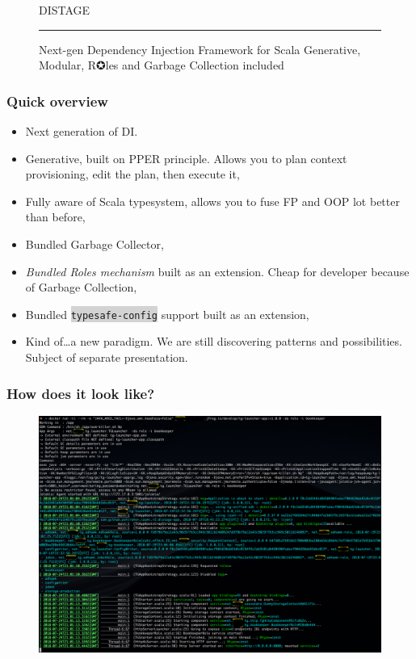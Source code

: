 \documentclass[usenames,dvipsnames]{beamer}
\newcommand{\code}[1]{\colorbox{lightgray}{\texttt{#1}}}
\begin{document}
\begin{frame}
\begin{figure}
\Huge 
\color{RubineRed} DISTAGE
\noindent
{\color{RubineRed} \rule{\linewidth}{1mm} }
\Large Next-gen Dependency Injection Framework for Scala
\normalsize Generative, Modular, R✪les and Garbage Collection included 
\end{figure}
\end{frame}

\begin{frame}
\frametitle{Quick overview}
\begin{itemize}
\item Next generation of DI.
\item Generative, built on PPER principle. Allows you to plan context provisioning, edit the plan, then execute it,
\item Fully aware of Scala typesystem, allows you to fuse FP and OOP lot better than before, 
\item Bundled Garbage Collector,
\item \textit{Bundled Roles mechanism} built as an extension. Cheap for developer because of Garbage Collection,
\item Bundled \code{typesafe-config} support built as an extension,
\item Kind of\dots a new paradigm. We are still discovering patterns and possibilities. Subject of separate presentation.
\end{itemize}
\end{frame}

\begin{frame}
\frametitle{How does it look like\footnotemark[1]?}
\end{frame}

\begin{frame}
\begin{figure}
    \includegraphics[width=\textwidth]{media/roles-example.png}
\end{figure}
\end{frame}
\end{document}
